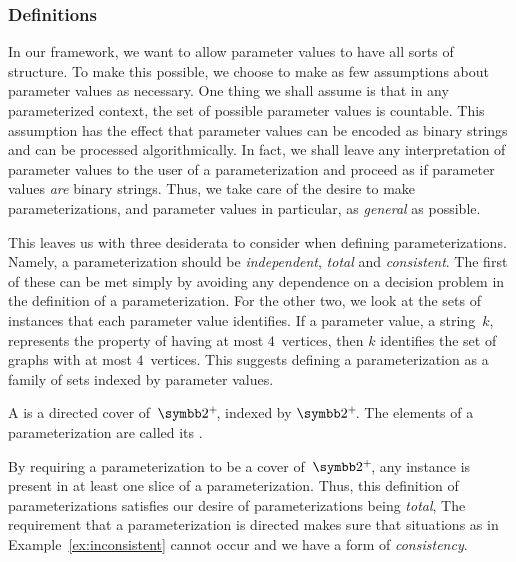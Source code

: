 \subsubsection{Definitions}
In our framework, we want to allow parameter values to have all sorts of structure.
To make this possible, we choose to make as few assumptions about parameter values as necessary.
One thing we shall assume is that in any parameterized context, the set of possible parameter values is countable.
This assumption has the effect that parameter values can be encoded as binary strings and can be processed algorithmically.
In fact, we shall leave any interpretation of parameter values to the user of a parameterization and proceed as if parameter values \emph{are} binary strings.
Thus, we take care of the desire to make parameterizations, and parameter values in particular, as \emph{general} as possible.

This leaves us with three desiderata to consider when defining parameterizations.
Namely, a parameterization should be \emph{independent}, \emph{total} and \emph{consistent}.
The first of these can be met simply by avoiding any dependence on a decision problem in the definition of a parameterization.
For the other two, we look at the sets of instances that each parameter value identifies.
If a parameter value, a string~$k$, represents the property of having at most $4$~vertices, then $k$ identifies the set of graphs with at most $4$~vertices.
This suggests defining a parameterization as a family of sets indexed by parameter values.
\begin{definition}
  A  is a directed cover of~$\binary^+\!$, indexed by $\binary^+\!$.
  The elements of a parameterization are called its .
\end{definition}

By requiring a parameterization to be a cover of~$\binary^+\!$, any instance is present in at least one slice of a parameterization.
Thus, this definition of parameterizations satisfies our desire of parameterizations being \emph{total},
The requirement that a parameterization is directed makes sure that situations as in Example~\ref{ex:inconsistent} cannot occur and we have a form of \emph{consistency}.

